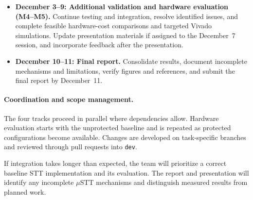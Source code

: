 \begin{itemize}
    \item \textbf{December 3--9:
    Additional validation and hardware evaluation
    (M4--M5).}
    Continue testing and integration, resolve identified
    issues, and complete feasible hardware-cost
    comparisons and targeted Vivado simulations.
    Update presentation materials if assigned to the
    December~7 session, and incorporate feedback after
    the presentation.

    \item \textbf{December 10--11:
    Final report.}
    Consolidate results, document incomplete mechanisms
    and limitations, verify figures and references,
    and submit the final report by December~11.
\end{itemize}

\paragraph{Coordination and scope management.}
The four tracks proceed in parallel where dependencies
allow. Hardware evaluation
starts with the unprotected baseline and is repeated
as protected configurations become available.
Changes are developed on task-specific branches and
reviewed through pull requests into \texttt{dev}.

If integration takes longer than expected, the team
will prioritize a correct baseline STT implementation
and its evaluation. The report and presentation will
identify any incomplete $\mu$STT mechanisms and
distinguish measured results from planned work.
